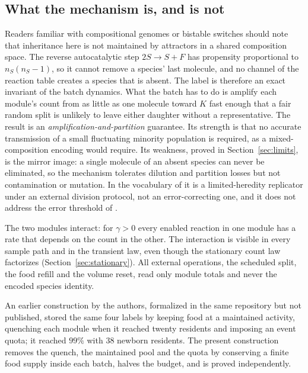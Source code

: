 \documentclass[11pt,a4paper]{article}
\theoremstyle{plain}
\theoremstyle{definition}
\theoremstyle{remark}
\begin{document}
\subsection{What the mechanism is, and is not}
Readers familiar with compositional genomes \citep{segre2000} or bistable switches should note that inheritance here is not maintained by attractors in a shared composition space. The reverse autocatalytic step $2S\to S+F$ has propensity proportional to $n_S(n_S-1)$, so it cannot remove a species' last molecule, and no channel of the reaction table creates a species that is absent. The label is therefore an exact invariant of the batch dynamics. What the batch has to do is amplify each module's count from as little as one molecule toward $K$ fast enough that a fair random split is unlikely to leave either daughter without a representative. The result is an \emph{amplification-and-partition} guarantee. Its strength is that no accurate transmission of a small fluctuating minority population is required, as a mixed-composition encoding would require. Its weakness, proved in Section~\ref{sec:limits}, is the mirror image: a single molecule of an absent species can never be eliminated, so the mechanism tolerates dilution and partition losses but not contamination or mutation. In the vocabulary of \citet{szathmary2006} it is a limited-heredity replicator under an external division protocol, not an error-correcting one, and it does not address the error threshold of \citet{eigen1971}.

The two modules interact: for $\gamma>0$ every enabled reaction in one module has a rate that depends on the count in the other. The interaction is visible in every sample path and in the transient law, even though the stationary count law factorizes (Section~\ref{sec:stationary}). All external operations, the scheduled split, the food refill and the volume reset, read only module totals and never the encoded species identity.

An earlier construction by the authors, formalized in the same repository but not published, stored the same four labels by keeping food at a maintained activity, quenching each module when it reached twenty residents and imposing an event quota; it reached $99\%$ with $38$ newborn residents. The present construction removes the quench, the maintained pool and the quota by conserving a finite food supply inside each batch, halves the budget, and is proved independently.
\end{document}
